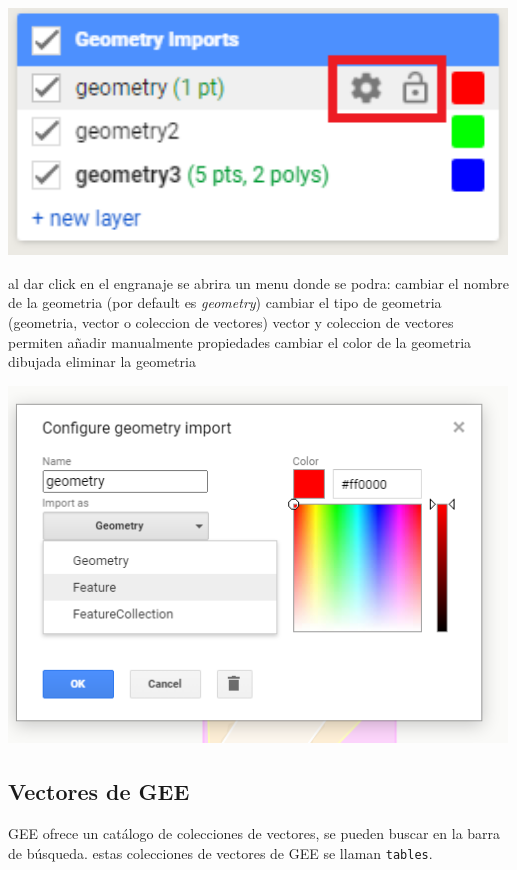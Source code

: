 \documentclass[
]{article}
\begin{document}
\begin{tipblock}
\includegraphics[width=500px]{Img/dibujarGeo}

al dar click en el engranaje se abrira un menu donde se podra: cambiar
el nombre de la geometria (por default es \emph{geometry}) cambiar el
tipo de geometria (geometria, vector o coleccion de vectores) vector y
coleccion de vectores permiten añadir manualmente propiedades cambiar el
color de la geometria dibujada eliminar la geometria

\includegraphics[width=500px]{Img/menuGeo}

\end{tipblock}

\hypertarget{vectores-de-gee}{%
\subsection{Vectores de GEE}\label{vectores-de-gee}}

GEE ofrece un catálogo de colecciones de vectores, se pueden buscar en
la barra de búsqueda. estas colecciones de vectores de GEE se llaman
\texttt{tables}.
\end{document}
